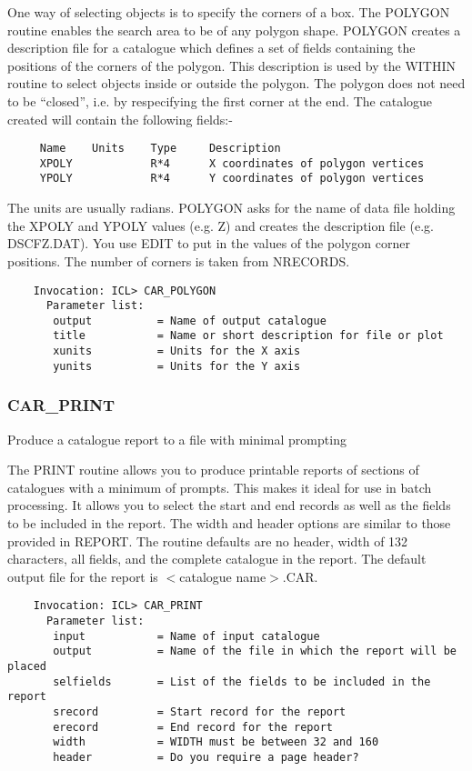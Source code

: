 One way of selecting objects is to specify the corners of a box.  
The POLYGON routine enables the search area to be of any polygon shape.
POLYGON creates a description file for a catalogue which
defines a set of fields containing the positions of the corners of the 
polygon.  
This description is used by the WITHIN routine to select objects 
inside or outside the polygon.
The polygon does not need to be ``closed'', i.e. by respecifying the first
corner at the end.
The catalogue created will contain the following fields:-
\begin{verbatim}
     Name    Units    Type     Description
     XPOLY            R*4      X coordinates of polygon vertices
     YPOLY            R*4      Y coordinates of polygon vertices
\end{verbatim}
The units are usually radians.
POLYGON asks for the name of data file holding the XPOLY and YPOLY values 
(e.g. Z) and creates the description file (e.g. DSCFZ.DAT).
You use EDIT to put in the values of the polygon corner positions.
The number of corners is taken from NRECORDS.
\begin{verbatim}
    Invocation: ICL> CAR_POLYGON
      Parameter list:
       output          = Name of output catalogue
       title           = Name or short description for file or plot
       xunits          = Units for the X axis
       yunits          = Units for the Y axis
\end{verbatim}

\subsubsection{CAR\_PRINT}
 
Produce a catalogue report to a file with minimal prompting
 
The PRINT routine allows you to produce printable reports of sections of 
catalogues with a minimum of prompts. 
This makes it ideal for use in batch processing.
It allows you to select the start and end records as well as the fields to be
included in the report.
The width and header options are similar to those provided in REPORT.
The routine defaults are no header, width of 132 characters, all fields, 
and the complete catalogue in the report.
The default output file for the report is $<$catalogue name$>$.CAR.
  
\begin{verbatim}
    Invocation: ICL> CAR_PRINT
      Parameter list:
       input           = Name of input catalogue
       output          = Name of the file in which the report will be placed
       selfields       = List of the fields to be included in the report
       srecord         = Start record for the report
       erecord         = End record for the report
       width           = WIDTH must be between 32 and 160 
       header          = Do you require a page header?
\end{verbatim}

